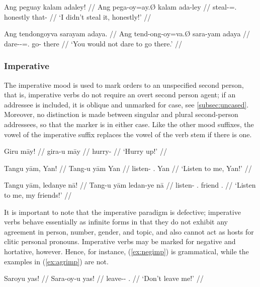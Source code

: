 \a\label{ex:negallo}\begingl
	\gla Ang peguay kalam adaley!  //
	\glb Ang pega-oy=ay.Ø kalam ada-ley //
	\glc \AgtT{} steal-\Neg{}=\Fsg{}.\Top{} honestly that-\PargI{} //
	\glft `I didn't steal it, honestly!' //
\endgl

\a\label{ex:irrneg}\begingl
	\gla Ang tendongoyva sarayam adaya. //
	\glb Ang tend-ong-oy=va.Ø sara-yam adaya //
	\glc \AgtT{} dare-\Irr{}-\Neg{}=\Ssg{}.\Top{} go-\Ptcp{} there //
	\glft `You would not dare to go there.' //
\endgl

\xe


\subsubsection{Imperative}

The imperative mood is used to mark orders to an unspecified second person, 
that is, imperative verbs do not require an overt second person agent; if an 
addressee is included, it is oblique and unmarked for case, see 
\autoref{subsec:uncased}. Moreover, no distinction is made between singular and 
plural second-person addressees, so that the marker is  in either 
case. Like the other mood suffixes, the vowel of the imperative suffix replaces 
the vowel of the verb stem if there is one.

\pex
\a\begingl
	\gla Giru māy! //
	\glb gira-u māy //
	\glc hurry-\Imp{} \Int{} //
	\glft `Hurry up!' //
\endgl

\a\begingl
	\gla Tangu yām, Yan! //
	\glb Tang-u yām Yan //
	\glc listen-\Imp{} \Fsg{}.\Dat{} Yan //
	\glft `Listen to me, Yan!' //
\endgl

\a\begingl
	\gla Tangu yām, ledanye nā! //
	\glb Tang-u yām ledan-ye nā //
	\glc listen-\Imp{} \Fsg{}.\Dat{} friend \Fsg{}.\Gen{} //
	\glft `Listen to me, my friends!' //
\endgl

\xe

It is important to note that the imperative paradigm is defective; imperative 
verbs behave essentially as infinite forms in that they do not exhibit any 
agreement in person, number, gender, and topic, and also cannot act as hosts 
for clitic personal pronouns. Imperative verbs may be marked for negative and 
hortative, however. Hence, for instance, (\ref{ex:negimp}) is grammatical, 
while the examples in (\ref{ex:agrimp}) are not.

\ex\label{ex:negimp}\begingl
	\gla Saroyu yas! //
	\glb Sara-oy-u yas! //
	\glc leave-\Neg{}-\Imp{} \Fsg{}.\Parg{} //
	\glft `Don't leave me!' //
\endgl\xe

